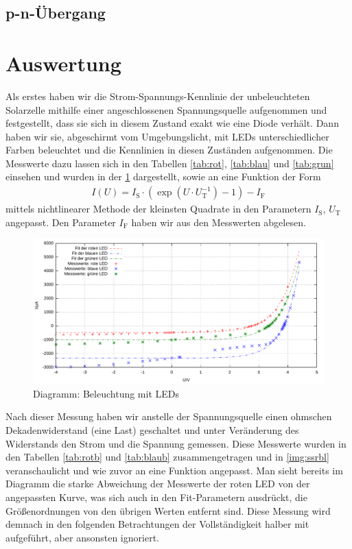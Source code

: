 \documentclass[numbers=noenddot,12pt,a4paper]{scrartcl}
\newcommand{\ix}[1]{_\text{#1}}
\begin{document}
\subsection{p-n-Übergang}

\section{Auswertung}
Als erstes haben wir die Strom-Spannungs-Kennlinie der unbeleuchteten Solarzelle mithilfe einer angeschlossenen Spannungsquelle aufgenommen und festgestellt, dass sie sich in diesem Zustand exakt wie eine Diode verhält. Dann haben wir sie, abgeschirmt vom Umgebungslicht, mit LEDs unterschiedlicher Farben beleuchtet und die Kennlinien in diesen Zuständen aufgenommen. Die Messwerte dazu lassen sich in den Tabellen \ref{tab:rot}, \ref{tab:blau} und \ref{tab:grun} einsehen und wurden in der \ref{img:ssrl} dargestellt, sowie an eine Funktion der Form
\begin{align}
I(U)=I\ix{S}\cdot\left(\exp\left(U\cdot U\ix{T}^{-1}\right)-1\right)-I\ix{F}
\end{align}
mittels nichtlinearer Methode der kleinsten Quadrate in den Parametern $I\ix{S}$, $U\ix{T}$ angepasst. Den Parameter $I\ix{F}$ haben wir aus den Messwerten abgelesen.
\begin{figure}[H]
	\includegraphics[width=1\textwidth]{messwerte/stromspannungspannungsrichtigled.pdf}
	\caption{Diagramm: Beleuchtung mit LEDs} \label{img:ssrl}
\end{figure}
Nach dieser Messung haben wir anstelle der Spannungsquelle einen ohmschen Dekadenwiderstand (eine Last) geschaltet und unter Veränderung des Widerstands den Strom und die Spannung gemessen. Diese Messwerte wurden in den Tabellen \ref{tab:rotb} und \ref{tab:blaub} zusammengetragen und in \ref{img:ssrbl} veranschaulicht und wie zuvor an eine Funktion angepasst. Man sieht bereits im Diagramm die starke Abweichung der Messwerte der roten LED von der angepassten Kurve, was sich auch in den Fit-Parametern ausdrückt, die Größenordnungen von den übrigen Werten entfernt sind. Diese Messung wird demnach in den folgenden Betrachtungen der Vollständigkeit halber mit aufgeführt, aber ansonsten ignoriert.
\end{document}
